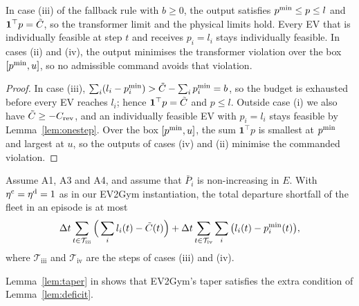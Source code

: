 \begin{lemma}[Fallback]\label{lem:fallback}
In case (iii) of the fallback rule with $b\ge0$, the output satisfies $p^{\min}\le p\le l$ and $\mathbf 1^\top p=\tilde C$, so the transformer limit and the physical limits hold.
Every EV that is individually feasible at step $t$ and receives $p_i=l_i$ stays individually feasible.
In cases (ii) and (iv), the output minimises the transformer violation over the box $[p^{\min},u]$, so no admissible command avoids that violation.
\end{lemma}

\begin{proof}
In case (iii), $\sum_i(l_i-p^{\min}_i)>\tilde C-\sum_ip^{\min}_i=b$, so the budget is exhausted before every EV reaches $l_i$; hence $\mathbf 1^\top p=\tilde C$ and $p\le l$.
Outside case (i) we also have $\tilde C\ge-C_{\mathrm{rev}}$, and an individually feasible EV with $p_i=l_i$ stays feasible by Lemma~\ref{lem:onestep}.
Over the box $[p^{\min},u]$, the sum $\mathbf 1^\top p$ is smallest at $p^{\min}$ and largest at $u$, so the outputs of cases (iv) and (ii) minimise the commanded violation.
\end{proof}

\begin{lemma}\label{lem:deficit}
Assume A1, A3 and A4, and assume that $\bar P_i$ is non-increasing in $E$.
With $\eta^{\mathrm c}=\eta^{\mathrm d}=1$ as in our EV2Gym instantiation, the total departure shortfall of the fleet in an episode is at most
\begin{equation}\label{eq:deficit}
\Delta t\sum_{t\in\mathcal T_{\mathrm{iii}}}\Big(\sum_il_i(t)-\tilde C(t)\Big)+\Delta t\sum_{t\in\mathcal T_{\mathrm{iv}}}\sum_i\big(l_i(t)-p^{\min}_i(t)\big),
\end{equation}
where $\mathcal T_{\mathrm{iii}}$ and $\mathcal T_{\mathrm{iv}}$ are the steps of cases (iii) and (iv).
\end{lemma}

Lemma~\ref{lem:taper} in  shows that EV2Gym's taper satisfies the extra condition of Lemma~\ref{lem:deficit}.

